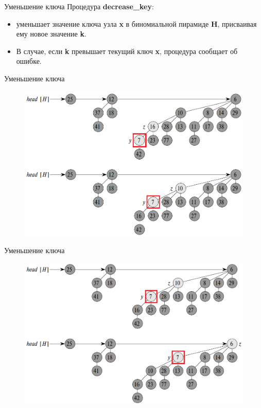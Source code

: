 \begin{frame}{Уменьшение ключа}
	Процедура \textbf{decrease\_key}:
	\begin{itemize}
		\item уменьшает значение ключа узла \textbf{x} в 
	биномиальной пирамиде \textbf{H}, присваивая ему новое значение \textbf{k}.
		\item В случае, если \textbf{k} превышает текущий ключ \textbf{x}, процедура сообщает об ошибке.
	\end{itemize}
\end{frame}
	
\begin{frame}{Уменьшение ключа}
	\begin{figure}
		\includegraphics[width=0.8\linewidth]{images/binom-heap-decrease0.png}
	\end{figure}
\end{frame}
		
\begin{frame}{Уменьшение ключа}
	\begin{figure}
		\includegraphics[width=0.8\linewidth]{images/binom-heap-decrease1.png}
	\end{figure}
\end{frame}

